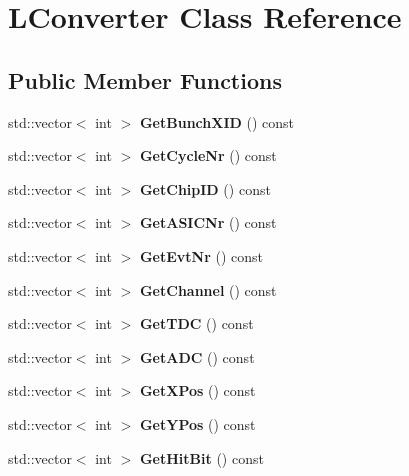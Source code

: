 \section{L\-Converter Class Reference}
\label{classLConverter}
\subsection*{Public Member Functions}
\begin{DoxyCompactItemize}
\item 
std\-::vector$<$ int $>$ {\bfseries Get\-Bunch\-X\-I\-D} () const \label{classLConverter_aa36cabb750e60dab0c27a8868fbf822f}

\item 
std\-::vector$<$ int $>$ {\bfseries Get\-Cycle\-Nr} () const \label{classLConverter_ade0160100df41b58edb54a6cccf265f2}

\item 
std\-::vector$<$ int $>$ {\bfseries Get\-Chip\-I\-D} () const \label{classLConverter_a7e258458a690e3f969078eb0e2b25550}

\item 
std\-::vector$<$ int $>$ {\bfseries Get\-A\-S\-I\-C\-Nr} () const \label{classLConverter_afd5677457e034b1314b16c12cb379a1e}

\item 
std\-::vector$<$ int $>$ {\bfseries Get\-Evt\-Nr} () const \label{classLConverter_a75d43fbe9aeb66f852a72ef5b3acdac3}

\item 
std\-::vector$<$ int $>$ {\bfseries Get\-Channel} () const \label{classLConverter_a421bc622c868a9acb10cbf371d967619}

\item 
std\-::vector$<$ int $>$ {\bfseries Get\-T\-D\-C} () const \label{classLConverter_a6b3fb44f0f5dd2aec1abea2b9c6b11a5}

\item 
std\-::vector$<$ int $>$ {\bfseries Get\-A\-D\-C} () const \label{classLConverter_a281711127b23f444867fd96ab112cec7}

\item 
std\-::vector$<$ int $>$ {\bfseries Get\-X\-Pos} () const \label{classLConverter_aa984a603c6c7dd60c412818d580d4a1e}

\item 
std\-::vector$<$ int $>$ {\bfseries Get\-Y\-Pos} () const \label{classLConverter_ab7e4941672713e1e654d964a2983e619}

\item 
std\-::vector$<$ int $>$ {\bfseries Get\-Hit\-Bit} () const \label{classLConverter_a373903e1cda893fccbc8a0a64581cedf}


\end{DoxyCompactItemize}

